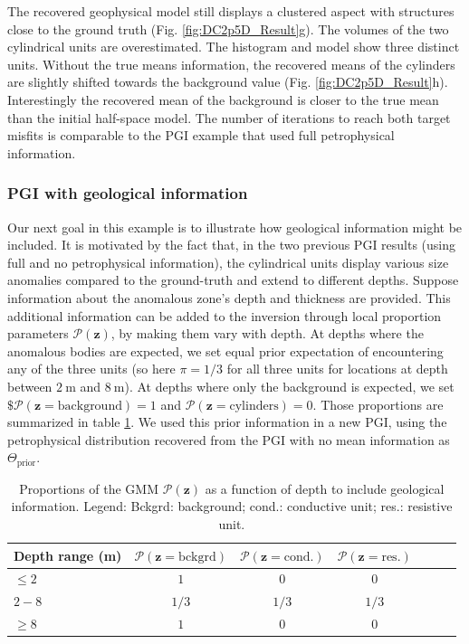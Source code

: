 \documentclass[extra]{gji} %
\begin{document}
The recovered geophysical model still displays a clustered aspect with structures close to the ground truth (Fig. \ref{fig:DC2p5D_Result}g). The volumes of the two cylindrical units are overestimated. The histogram and model show three distinct units. Without the true means information, the recovered means of the cylinders are slightly shifted towards the background value (Fig. \ref{fig:DC2p5D_Result}h). Interestingly the recovered mean of the background is closer to the true mean than the initial half-space model. The number of iterations to reach both target misfits is comparable to the PGI example that used full petrophysical information.


\subsubsection{PGI with geological information}

Our next goal in this example is to illustrate how geological information might be included. It is motivated by the fact that, in the two previous PGI results (using full and no petrophysical information), the cylindrical units display various size anomalies compared to the ground-truth and extend to different depths. Suppose information about the anomalous zone's depth and thickness are provided. This additional information can be added to the inversion through local proportion parameters $\mathcal{P}(\mathbf{z})$, by making them vary with depth. At depths where the anomalous bodies are expected, we set equal prior expectation of encountering any of the three units (so here $\pi=1/3$ for all three units for locations at depth between $2~\text{m}$ and $8~\text{m}$). At depths where only the background is expected, we set $\$\mathcal{P}(\mathbf{z}=\text{background})=1$ and $\mathcal{P}(\mathbf{z}=\text{cylinders})=0$. Those proportions are summarized in table \ref{proportions_depth}. We used this prior information in a new PGI, using the petrophysical distribution recovered from the PGI with no mean information as $\Theta_{\text{prior}}$.

\begin{table}
 \caption{Proportions of the GMM $\mathcal{P}(\mathbf{z})$ as a function of depth to include geological information. Legend: Bckgrd: background; cond.: conductive unit; res.: resistive unit.}
 \label{proportions_depth}
 \begin{tabular}{@{}lcccccc}
\hline
  Depth range (m) & $\mathcal{P}(\mathbf{z}=\text{bckgrd})$ & $\mathcal{P}(\mathbf{z}=\text{cond.})$ & $\mathcal{P}(\mathbf{z}=\text{res.})$ \\
\hline
  $\leq 2$ & $1$ & $0$ & $0$ \\
  $2-8$ & $1/3$ & $1/3$ & $1/3$ \\
  $\geq 8$ & $1$ & $0$ & $0$\\
\hline
 \end{tabular}
\end{table}
\end{document}
